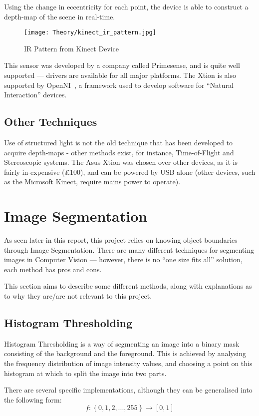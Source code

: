 Using the change in eccentricity for each point, the device is able to construct a depth-map of the scene in real-time.

\begin{figure}[H]
\centering
\texttt{[image: Theory/kinect\_ir\_pattern.jpg]}
\caption{IR Pattern from Kinect Device~\cite{primesense-irstream}}
\end{figure}

This sensor was developed by a company called Primesense, and is quite well supported --- drivers are available for all major platforms. The Xtion is also supported by OpenNI~\cite{openni}, a framework used to develop software for ``Natural Interaction'' devices. 

\subsection{Other Techniques}
Use of structured light is not the old technique that has been developed to acquire depth-maps - other methods exist, for instance, Time-of-Flight and Stereoscopic systems. The Asus Xtion was chosen over other devices, as it is fairly in-expensive (\~£100), and can be powered by USB alone (other devices, such as the Microsoft Kinect, require mains power to operate). 

\section{Image Segmentation}
As seen later in this report, this project relies on knowing object boundaries through Image Segmentation. There are many different techniques for segmenting images in Computer Vision --- however, there is no ``one size fits all'' solution, each method has pros and cons. 
\label{sec:segment}

This section aims to describe some different methods, along with explanations as to why they are/are not relevant to this project.

\subsection{Histogram Thresholding} 
Histogram Thresholding is a way of segmenting an image into a binary mask consisting of the background and the foreground. This is achieved by analysing the frequency distribution of image intensity values, and choosing a point on this histogram at which to split the image into two parts.  

There are several specific implementations, although they can be generalised into the following form:
\begin{equation}
f: \left\{{0,1,2,...,255}\right\} \rightarrow [0, 1]
\end{equation}

